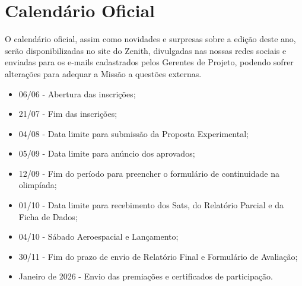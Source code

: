 \section{Calendário Oficial} 
    O calendário oficial, assim como novidades e surpresas sobre a edição deste ano, serão disponibilizadas no site do Zenith, divulgadas nas nossas redes sociais e enviadas para os e-mails cadastrados pelos Gerentes de Projeto, podendo sofrer alterações para adequar a Missão a questões externas. 
    \begin{itemize}
        \item 06/06 - Abertura das inscrições;
        \item 21/07 - Fim das inscrições;
        \item 04/08 - Data limite para submissão da Proposta Experimental;
        \item 05/09 - Data limite para anúncio dos aprovados;
        \item 12/09 - Fim do período para preencher o formulário de continuidade na olimpíada;
        \item 01/10 - Data limite para recebimento dos Sats, do Relatório Parcial e da Ficha de Dados;
        \item 04/10 - Sábado Aeroespacial e Lançamento;
        \item 30/11 - Fim do prazo de envio de Relatório Final e Formulário de Avaliação;
        \item Janeiro de 2026 - Envio das premiações e certificados de participação.
    \end{itemize}